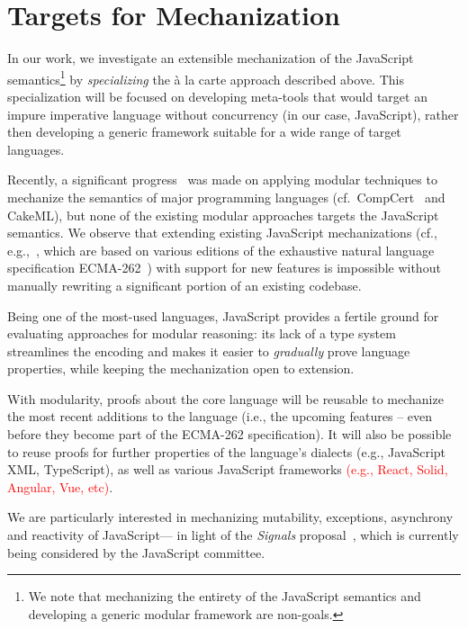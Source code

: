 \documentclass[sigplan,nonacm]{acmart}
\begin{document}
\section{Targets for Mechanization}

In our work,
we investigate an extensible mechanization of the JavaScript semantics\footnote{We note that mechanizing the entirety of the JavaScript semantics
and developing a generic modular framework are non-goals.}
by \emph{specializing} the à la carte approach described above.
This specialization will be focused on developing meta-tools that would target an impure imperative language without concurrency (in our case, JavaScript),
rather then developing a generic framework suitable for a wide range of target languages.

Recently, a significant progress~\cite{ebresafe2025certified} was made on applying modular techniques
to mechanize the semantics of major programming languages (cf.~CompCert~\cite{leroy2016compcert} and CakeML\cite{kumar2014cakeml}),
but none of the existing modular approaches targets the JavaScript semantics.
We observe that extending existing JavaScript mechanizations
(cf., e.g.,~\cite{guha2010essence,bodin2014trusted}, which are based on various editions of the exhaustive natural language specification ECMA-262~\cite{ECMA})
with support for new features
is impossible without manually rewriting a significant portion of an existing codebase.


Being one of the most-used languages, JavaScript provides a fertile ground for evaluating approaches for modular reasoning:
its lack of a type system streamlines the encoding and makes it easier to \emph{gradually} prove language properties,
while keeping the mechanization open to extension.

With modularity, proofs about the core language
will be reusable to mechanize the most recent additions to the language
(i.e., the upcoming features -- even before they become part of the ECMA-262 specification).
It will also be possible to reuse proofs for further properties
of the language's dialects (e.g., JavaScript XML, TypeScript),
as well as various JavaScript frameworks \textcolor{red}{(e.g., React, Solid, Angular, Vue, etc)}.

We are particularly interested in mechanizing
mutability, exceptions, asynchrony and reactivity of JavaScript---%
in light of the \emph{Signals} proposal~\cite{signals-proposal-t39},
which is currently being considered by the JavaScript committee.
\end{document}
